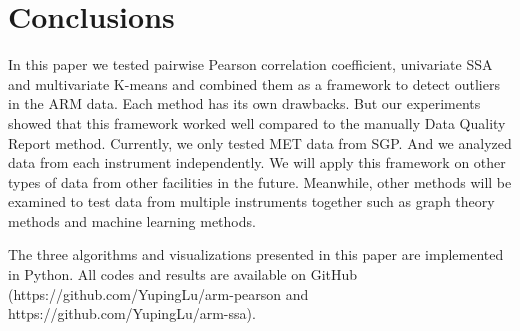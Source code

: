 \section{Conclusions}
In this paper we tested pairwise Pearson correlation coefficient, univariate SSA and multivariate K-means and combined them as a framework to detect outliers in the ARM data. Each method has its own drawbacks. But our experiments showed that this framework worked well compared to the manually Data Quality Report method. Currently, we only tested MET data from SGP. And we analyzed data from each instrument independently. We will apply this framework on other types of data from other facilities in the future. Meanwhile, other methods will be examined to test data from multiple instruments together such as graph theory methods \cite{phillips2015graph} and machine learning methods. 


The three algorithms and visualizations presented in this paper are 
implemented in Python. All codes and results are available on GitHub 
(https://github.com/YupingLu/arm-pearson and https://github.com/YupingLu/arm-ssa). 
